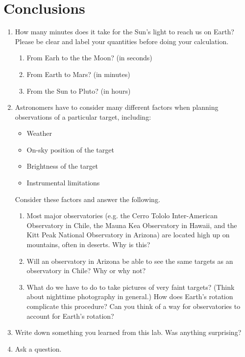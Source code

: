 \documentclass[12pt]{article}%
\begin{document}
\section{Conclusions}
\begin{enumerate}
\item How many minutes does it take for the Sun's light to reach us on Earth? Please be clear and label your quantities before doing your calculation.
    \begin{enumerate}
    \item From Earh to the the Moon? (in seconds)
    \item From Earth to Mars? (in minutes)
    \item From the Sun to Pluto? (in hours)
    \end{enumerate}
\item Astronomers have to consider many different factors when planning observations of a particular target, including:
           \begin{itemize}
           \item Weather
           \item On-sky position of the target
           \item Brightness of the target
           \item Instrumental limitations
           \end{itemize}
Consider these factors and answer the following.
           \begin{enumerate}
           \item Most major observatories (e.g. the Cerro Tololo Inter-American Observatory in Chile, the Mauna Kea Observatory in Hawaii, and the Kitt Peak National Observatory in Arizona) are located high up on mountains, often in deserts. Why is this?
           \item Will an observatory in Arizona be able to see the same targets as an observatory in Chile? Why or why not?
           \item What do we have to do to take pictures of very faint targets? (Think about nighttime photography in general.) How does Earth's rotation complicate this procedure? Can you think of a way for observatories to account for Earth's rotation?
           \end{enumerate}
 
\item Write down something you learned from this lab. Was anything surprising?
\item Ask a question. 
\end{enumerate}
 
\end{document}
